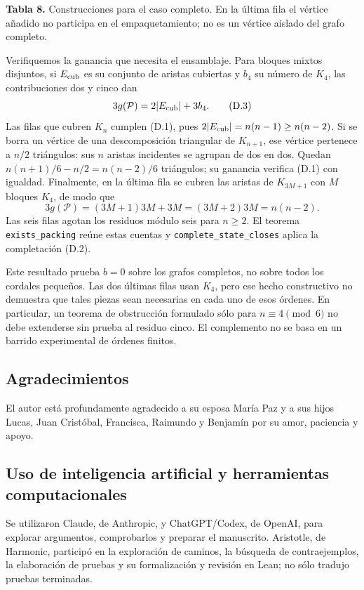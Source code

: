 \documentclass[spanish,11pt,a4paper]{article}
\begin{document}
\textbf{Tabla 8.} Construcciones para el caso completo. En la última fila el vértice añadido no participa en el empaquetamiento; no es un vértice aislado del grafo completo.

Verifiquemos la ganancia que necesita el ensamblaje. Para bloques mixtos disjuntos, si \(E_{\rm cub}\) es su conjunto de aristas cubiertas y \(b_4\) su número de \(K_4\), las contribuciones dos y cinco dan \[
3g(\mathcal P)=2|E_{\rm cub}|+3b_4.
\tag{D.3}
\] Las filas que cubren \(K_n\) cumplen (D.1), pues \(2|E_{\rm cub}|=n(n-1)\ge n(n-2)\). Si se borra un vértice de una descomposición triangular de \(K_{n+1}\), ese vértice pertenece a \(n/2\) triángulos: sus \(n\) aristas incidentes se agrupan de dos en dos. Quedan \(n(n+1)/6-n/2=n(n-2)/6\) triángulos; su ganancia verifica (D.1) con igualdad. Finalmente, en la última fila se cubren las aristas de \(K_{3M+1}\) con \(M\) bloques \(K_4\), de modo que \[
3g(\mathcal P)=(3M+1)3M+3M=(3M+2)3M=n(n-2).
\tag{D.4}
\] Las seis filas agotan los residuos módulo seis para \(n\ge2\). El teorema \nolinkurl{exists_packing} reúne estas cuentas y \nolinkurl{complete_state_closes} aplica la completación (D.2).

Este resultado prueba \(b=0\) sobre los grafos completos, no sobre todos los cordales pequeños. Las dos últimas filas usan \(K_4\), pero ese hecho constructivo no demuestra que tales piezas sean necesarias en cada uno de esos órdenes. En particular, un teorema de obstrucción formulado sólo para \(n\equiv4\pmod6\) no debe extenderse sin prueba al residuo cinco. El complemento no se basa en un barrido experimental de órdenes finitos.

\subsection{Agradecimientos}\label{agradecimientos}

El autor está profundamente agradecido a su esposa María Paz y a sus hijos Lucas, Juan Cristóbal, Francisca, Raimundo y Benjamín por su amor, paciencia y apoyo.

\subsection{Uso de inteligencia artificial y herramientas computacionales}\label{uso-de-inteligencia-artificial-y-herramientas-computacionales}

Se utilizaron Claude, de Anthropic, y ChatGPT/Codex, de OpenAI, para explorar argumentos, comprobarlos y preparar el manuscrito. Aristotle, de Harmonic, participó en la exploración de caminos, la búsqueda de contraejemplos, la elaboración de pruebas y su formalización y revisión en Lean; no sólo tradujo pruebas terminadas.
\end{document}
